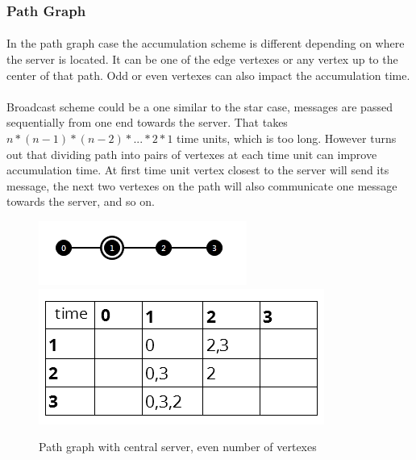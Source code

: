 \documentclass[a4paper,TexShade]{class}
\begin{document}
\newpage
\bigskip
\subsubsection{Path Graph}
\paragraph{} In the path graph case the accumulation scheme is different depending on where the server is located. It can be one of the edge vertexes or any vertex up to the center of that path. Odd or even vertexes can also impact the accumulation time.

\paragraph{} Broadcast scheme could be a one similar to the star case, messages are passed sequentially from one end towards the server. That takes \linebreak\textit{ $n * (n - 1) * (n - 2) * ... * 2 * 1$ } time units, which is too long. However turns out that dividing path into pairs of vertexes at each time unit can improve accumulation time. At first time unit vertex closest to the server will send its message, the next two vertexes on the path will also communicate one message towards the server, and so on. 

\bigskip
\begin{figure}[hb]
\centering
\caption{Path graph with central server, even number of vertexes} \label{fig:path-centre-even}
\includegraphics[width=0.49\linewidth ,natwidth=258,natheight=29]{images/path-centre-even.png}
\bigskip
\includegraphics[width=0.49\linewidth ,natwidth=258,natheight=29]{images/path-centre-even-table.png}
\end{figure}
\end{document}
